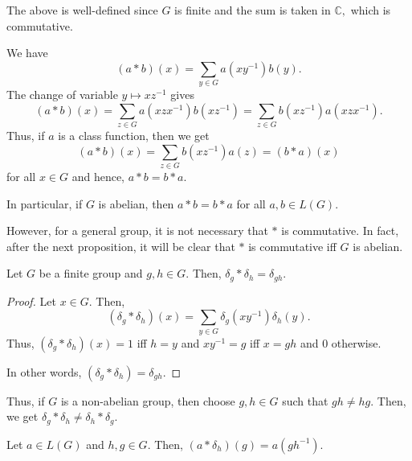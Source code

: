 The above is well-defined since $G$ is finite and the sum is taken in $\mathbb{C},$ which is commutative. 

\begin{rem} \label{rem:classfunctionincenter}
    We have
    \begin{equation*}
        (a * b)(x) = \sum_{y \in G} a(xy^{-1})b(y).
    \end{equation*}
    The change of variable $y \mapsto xz^{-1}$ gives
    \begin{equation*}
        (a * b)(x) = \sum_{z \in G} a(xzx^{-1})b(xz^{-1}) = \sum_{z \in G} b(xz^{-1})a(xzx^{-1}).
    \end{equation*}
    Thus, if $a$ is a class function, then we get
    \begin{equation*}
        (a * b)(x) = \sum_{z \in G} b(xz^{-1})a(z) = (b * a)(x)
    \end{equation*}
    for all $x \in G$ and hence, $a * b = b * a.$
    
    In particular, if $G$ is abelian, then $a * b = b * a$ for all $a, b \in L(G).$
    
    However, for a general group, it is not necessary that $*$ is commutative. In fact, after the next proposition, it will be clear that $*$ is commutative iff $G$ is abelian.
\end{rem}

\begin{prop} \label{prop:convdeltaprod}
    Let $G$ be a finite group and $g, h \in G.$ Then, $\delta_g * \delta_h = \delta_{gh}.$
\end{prop}
\begin{proof}
    Let $x \in G.$ Then,
    \begin{equation*}
        (\delta_g * \delta_h)(x) = \sum_{y \in G} \delta_g(xy^{-1})\delta_h(y).
    \end{equation*}
    Thus, $(\delta_g * \delta_h)(x) = 1$ iff $h = y$ and $xy^{-1} = g$ iff $x = gh$ and $0$ otherwise.
    
    In other words, $(\delta_g * \delta_h) = \delta_{gh}.$
\end{proof}

Thus, if $G$ is a non-abelian group, then choose $g, h \in G$ such that $gh \neq hg.$ Then, we get $\delta_g * \delta_h \neq \delta_h * \delta_g.$ 

\begin{prop} \label{prop:convole}
    Let $a \in L(G)$ and $h, g \in G.$ Then, $(a * \delta_h)(g) = a(gh^{-1}).$
\end{prop}

